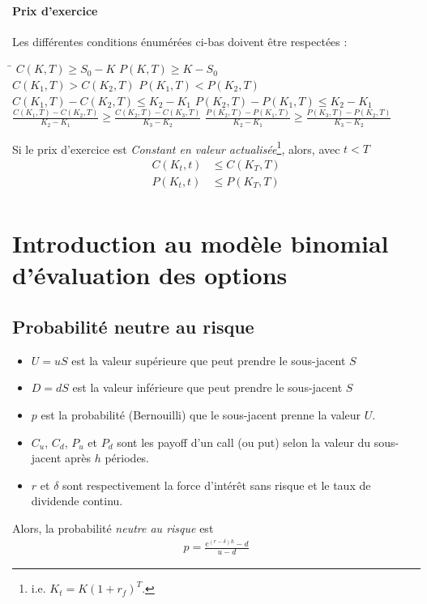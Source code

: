 \documentclass[10pt, french]{article}
\begin{document}
\begin{multicols*}{2}
\paragraph{Prix d'exercice}
Les différentes conditions énumérées ci-bas doivent être respectées : 
\begin{tabbing}
\hspace{5cm}\=\kill
 $C(K,T) \geq S_0 - K$ \>  $ P(K,T) \geq K - S_0$ \\ 
  $C(K_1, T) > C(K_2, T)$ \> $P(K_1, T) < P(K_2, T)$ \\
 $C(K_1, T) - C(K_2, T) \leq K_2 - K_1$ \> $P(K_2, T) - P(K_1, T) \leq K_2 - K_1$ \\
 $\frac{C(K_1, T) - C(K_2, T)}{K_2 - K_1} \geq \frac{C(K_2, T) - C(K_3, T)}{K_3 - K_2}$ \>  $\frac{P(K_2, T) - P(K_1, T)}{K_2 - K_1} \geq \frac{P(K_3, T) - P(K_2, T)}{K_3 - K_2}$ \\
\end{tabbing}
Si le prix d'exercice est \textit{Constant en valeur actualisée}\footnote{i.e. $K_t = K(1+r_f)^{T}$.}, alors, avec $t < T$
\begin{align*}
C(K_t, t) & \leq C(K_T, T) \\
P(K_t, t) & \leq P(K_T, T) \\
\end{align*}

\section{Introduction au modèle binomial d'évaluation des options}
\subsection*{Probabilité neutre au risque}
\begin{itemize}
\item $U = uS$ est la valeur supérieure que peut prendre le sous-jacent $S$
\item $D = dS$ est la valeur inférieure que peut prendre le sous-jacent $S$
\item $p$ est la probabilité (Bernouilli) que le sous-jacent prenne la valeur $U$.
\item $C_u$, $C_d$, $P_u$ et $P_d$ sont les payoff d'un call (ou put) selon la valeur du sous-jacent après $h$ périodes.
\item $r$ et $\delta$ sont respectivement la force d'intérêt sans risque et le taux de dividende continu.
\end{itemize}
 Alors, la probabilité \textit{neutre au risque} est
\begin{align*}
p = \frac{e^{(r-\delta)h} - d}{u-d}
\end{align*}


\end{multicols*}
\end{document}
